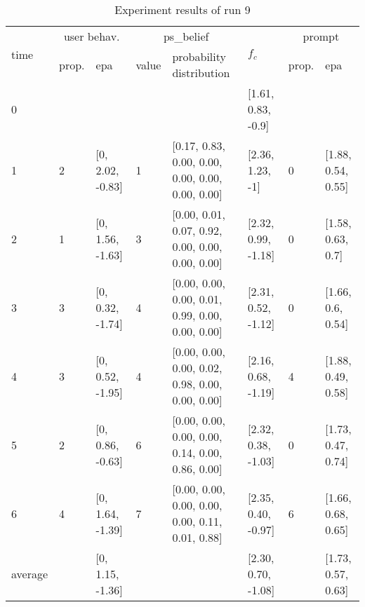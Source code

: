 \begin{table}[htbp]\footnotesize
\caption{Experiment results of run 9}
\begin{tabular}{|p{0.4cm}|p{0.6cm}|l|p{0.6cm}|p{3.3cm}|l|p{0.6cm}|l|}
\hline

\multirow{2}{*}{time} & \multicolumn{2}{c|}{user behav.} & \multicolumn{2}{c|}{ps\_belief} &
\multirow{2}{*}{$f_c$} & \multicolumn{2}{c|}{prompt} \\ \cline{2-5}\cline{ 7- 8}
& prop. & epa & value & probability distribution &  & prop. & epa \\ \hline

0 & \multicolumn{1}{l|}{} &  & \multicolumn{1}{l|}{} &  & [1.61, 0.83, -0.9] & \multicolumn{1}{l|}{} &  \\ \hline
1 & 2 & [0, 2.02, -0.83] & 1 & [0.17, 0.83, 0.00, 0.00, 0.00, 0.00, 0.00, 0.00] & [2.36, 1.23, -1] & 0 & [1.88, 0.54, 0.55] \\ \hline
2 & 1 & [0, 1.56, -1.63] & 3 & [0.00, 0.01, 0.07, 0.92, 0.00, 0.00, 0.00, 0.00] & [2.32, 0.99, -1.18] & 0 & [1.58, 0.63, 0.7] \\ \hline
3 & 3 & [0, 0.32, -1.74] & 4 & [0.00, 0.00, 0.00, 0.01, 0.99, 0.00, 0.00, 0.00] & [2.31, 0.52, -1.12] & 0 & [1.66, 0.6, 0.54] \\ \hline
4 & 3 & [0, 0.52, -1.95] & 4 & [0.00, 0.00, 0.00, 0.02, 0.98, 0.00, 0.00, 0.00] & [2.16, 0.68, -1.19] & 4 & [1.88, 0.49, 0.58] \\ \hline
5 & 2 & [0, 0.86, -0.63] & 6 & [0.00, 0.00, 0.00, 0.00, 0.14, 0.00, 0.86, 0.00] & [2.32, 0.38, -1.03] & 0 & [1.73, 0.47, 0.74] \\ \hline
6 & 4 & [0, 1.64, -1.39] & 7 & [0.00, 0.00, 0.00, 0.00, 0.00, 0.11, 0.01, 0.88] & [2.35, 0.40, -0.97] & 6 & [1.66, 0.68, 0.65] \\ \hline
\multicolumn{1}{|l|}{average} & \multicolumn{1}{l|}{} & [0, 1.15, -1.36] & \multicolumn{1}{l|}{} &  & [2.30, 0.70, -1.08] & \multicolumn{1}{l|}{} & [1.73, 0.57, 0.63] \\ \hline
\end{tabular}
\label{}
\end{table}


